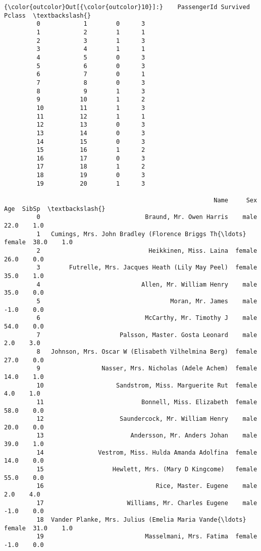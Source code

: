 \documentclass[11pt]{article}
\begin{document}
\begin{Verbatim}[commandchars=\\\{\}]
{\color{outcolor}Out[{\color{outcolor}10}]:}    PassengerId Survived Pclass  \textbackslash{}
         0            1        0      3   
         1            2        1      1   
         2            3        1      3   
         3            4        1      1   
         4            5        0      3   
         5            6        0      3   
         6            7        0      1   
         7            8        0      3   
         8            9        1      3   
         9           10        1      2   
         10          11        1      3   
         11          12        1      1   
         12          13        0      3   
         13          14        0      3   
         14          15        0      3   
         15          16        1      2   
         16          17        0      3   
         17          18        1      2   
         18          19        0      3   
         19          20        1      3   
         
                                                          Name     Sex   Age  SibSp  \textbackslash{}
         0                             Braund, Mr. Owen Harris    male  22.0    1.0   
         1   Cumings, Mrs. John Bradley (Florence Briggs Th{\ldots}  female  38.0    1.0   
         2                              Heikkinen, Miss. Laina  female  26.0    0.0   
         3        Futrelle, Mrs. Jacques Heath (Lily May Peel)  female  35.0    1.0   
         4                            Allen, Mr. William Henry    male  35.0    0.0   
         5                                    Moran, Mr. James    male  -1.0    0.0   
         6                             McCarthy, Mr. Timothy J    male  54.0    0.0   
         7                      Palsson, Master. Gosta Leonard    male   2.0    3.0   
         8   Johnson, Mrs. Oscar W (Elisabeth Vilhelmina Berg)  female  27.0    0.0   
         9                 Nasser, Mrs. Nicholas (Adele Achem)  female  14.0    1.0   
         10                    Sandstrom, Miss. Marguerite Rut  female   4.0    1.0   
         11                           Bonnell, Miss. Elizabeth  female  58.0    0.0   
         12                     Saundercock, Mr. William Henry    male  20.0    0.0   
         13                        Andersson, Mr. Anders Johan    male  39.0    1.0   
         14               Vestrom, Miss. Hulda Amanda Adolfina  female  14.0    0.0   
         15                   Hewlett, Mrs. (Mary D Kingcome)   female  55.0    0.0   
         16                               Rice, Master. Eugene    male   2.0    4.0   
         17                       Williams, Mr. Charles Eugene    male  -1.0    0.0   
         18  Vander Planke, Mrs. Julius (Emelia Maria Vande{\ldots}  female  31.0    1.0   
         19                            Masselmani, Mrs. Fatima  female  -1.0    0.0   
         

\end{Verbatim}
\end{document}
